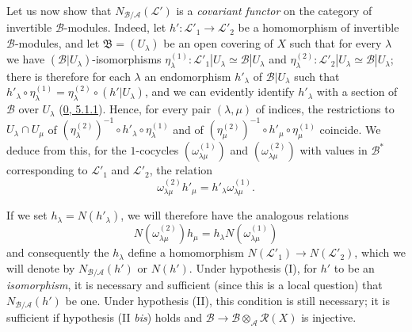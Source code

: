 \begin{env}[6.5.3]
\label{II.6.5.3}
Let us now show that $N_{\mathcal{B}/\mathcal{A}}(\mathcal{L}')$ is a
\emph{covariant functor} on the category of invertible
$\mathcal{B}$-modules. Indeed, let $h':\mathcal{L}'_1\to\mathcal{L}'_2$ be a
homomorphism of invertible $\mathcal{B}$-modules, and let
$\mathfrak{B}=(U_\lambda)$ be an open covering of $X$ such that for every
$\lambda$ we have $(\mathcal{B}|U_\lambda)$-isomorphisms
$\eta^{(1)}_\lambda:\mathcal{L}'_1|U_\lambda\simeq\mathcal{B}|U_\lambda$ and
$\eta^{(2)}_\lambda:\mathcal{L}'_2|U_\lambda\simeq\mathcal{B}|U_\lambda$;
there is therefore for each $\lambda$ an endomorphism $h'_\lambda$ of
$\mathcal{B}|U_\lambda$ such that
$h'_\lambda\circ\eta^{(1)}_\lambda
=\eta^{(2)}_\lambda\circ(h'|U_\lambda)$, and we can evidently identify
$h'_\lambda$ with a section of $\mathcal{B}$ over $U_\lambda$
(\hyperref[0.5.1.1]{0, 5.1.1}). Hence, for every pair $(\lambda,\mu)$ of
indices, the restrictions to $U_\lambda\cap U_\mu$ of
$(\eta^{(2)}_\lambda)^{-1}\circ h'_\lambda\circ\eta^{(1)}_\lambda$ and of
$(\eta^{(2)}_\mu)^{-1}\circ h'_\mu\circ\eta^{(1)}_\mu$ coincide. We deduce
from this, for the $1$-cocycles $(\omega^{(1)}_{\lambda\mu})$ and
$(\omega^{(2)}_{\lambda\mu})$ with values in $\mathcal{B}^*$ corresponding to
$\mathcal{L}'_1$ and $\mathcal{L}'_2$, the relation
\[
\omega^{(2)}_{\lambda\mu}h'_\mu
=h'_\lambda\omega^{(1)}_{\lambda\mu}.
\]


If we set $h_\lambda=N(h'_\lambda)$, we will therefore have the analogous
relations
\[
N(\omega^{(2)}_{\lambda\mu})h_\mu
=h_\lambda N(\omega^{(1)}_{\lambda\mu})
\]
and consequently the $h_\lambda$ define a homomorphism
$N(\mathcal{L}'_1)\to N(\mathcal{L}'_2)$, which we will denote by
$N_{\mathcal{B}/\mathcal{A}}(h')$ or $N(h')$. Under hypothesis (I), for
$h'$ to be an \emph{isomorphism}, it is necessary and sufficient (since this
is a local question) that $N_{\mathcal{B}/\mathcal{A}}(h')$ be one. Under
hypothesis (II), this condition is still necessary; it is sufficient if
hypothesis (II \emph{bis}) holds and
$\mathcal{B}\to\mathcal{B}\otimes_{\mathcal{A}}\mathcal{R}(X)$ is injective.


\end{env}
